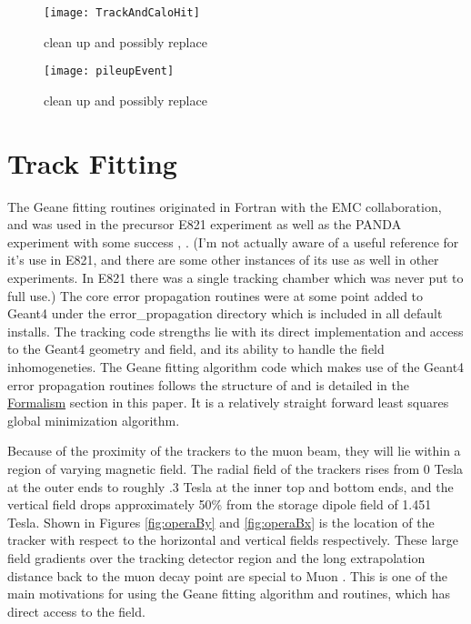 \begin{figure}[]
	\caption[TrackAndCaloHit]{clean up and possibly replace}	
	\centering
	\texttt{[image: TrackAndCaloHit]}
	\label{fig:TrackAndCaloHit}
\end{figure}

\begin{figure}[]
	\caption[pileupEvent]{clean up and possibly replace}	
	\centering
	\texttt{[image: pileupEvent]}
	\label{fig:pileupEvent}
\end{figure}




\section{Track Fitting}
\label{sec:Track Fitting}

The Geane fitting routines originated in Fortran with the EMC collaboration, and was used in the precursor E821 experiment as well as the PANDA experiment with some success \cite{geanemanual}, \cite{Lavezzi}. (I'm not actually aware of a useful reference for it's use in E821, and there are some other instances of its use as well in other experiments. In E821 there was a single tracking chamber which was never put to full use.) The core error propagation routines were at some point added to Geant4 under the error\_propagation directory which is included in all default installs. The tracking code strengths lie with its direct implementation and access to the Geant4 geometry and field, and its ability to handle the field inhomogeneties. The Geane fitting algorithm code which makes use of the Geant4 error propagation routines follows the structure of \cite{geanemanual} and is detailed in the \hyperref[sec:Formalism]{Formalism} section in this paper. It is a relatively straight forward least squares global \chisq minimization algorithm. 


Because of the proximity of the trackers to the muon beam, they will lie within a region of varying magnetic field. The radial field of the trackers rises from 0 Tesla at the outer ends to roughly .3 Tesla at the inner top and bottom ends, and the vertical field drops approximately 50\% from the storage dipole field of 1.451 Tesla. Shown in Figures \ref{fig:operaBy} and \ref{fig:operaBx} is the location of the tracker with respect to the horizontal and vertical fields respectively. These large field gradients over the tracking detector region and the long extrapolation distance back to the muon decay point are special to Muon \gmtwo. This is one of the main motivations for using the Geane fitting algorithm and routines, which has direct access to the field.


